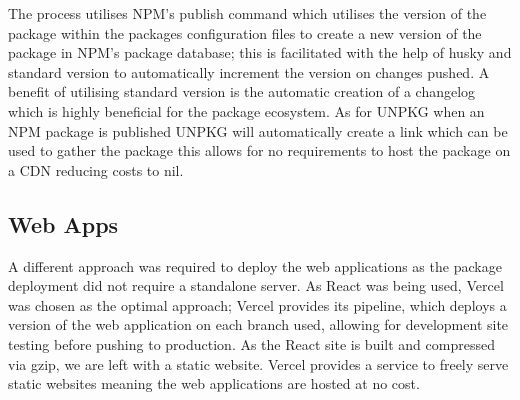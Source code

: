 \documentclass{l4proj}
\begin{document}
The process utilises NPM's publish command which utilises the version of the package within the packages configuration files to create a new version of the package in NPM's package database; this is facilitated with the help of husky and standard version to automatically increment the version on changes pushed. A benefit of utilising standard version is the automatic creation of a changelog which is highly beneficial for the package ecosystem. As for UNPKG when an NPM package is published UNPKG will automatically create a link which can be used to gather the package this allows for no requirements to host the package on a CDN reducing costs to nil.
\subsection{Web Apps}
A different approach was required to deploy the web applications as the package deployment did not require a standalone server. As React was being used, Vercel was chosen as the optimal approach; Vercel provides its pipeline, which deploys a version of the web application on each branch used, allowing for development site testing before pushing to production. As the React site is built and compressed via gzip, we are left with a static website. Vercel provides a service to freely serve static websites meaning the web applications are hosted at no cost.


\end{document}
